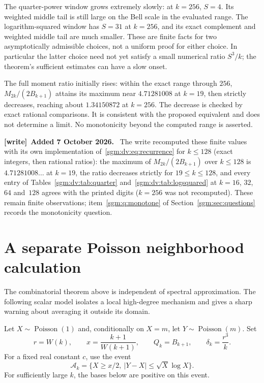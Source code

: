 \documentclass[11pt,letterpaper]{article}
\theoremstyle{remark}\newtheorem{remark}[theorem]{Remark}
\newcommand{\Poi}{\operatorname{Poisson}}\newcommand{\Bin}{\operatorname{Bin}}
\newenvironment{writenote}[1][]{\par\smallskip\begingroup\small
 \noindent\textbf{[write]}\if\relax\detokenize{#1}\relax\else~\textbf{#1.}\fi\ }%
 {\par\endgroup\smallskip}
\theoremstyle{definition}\newtheorem{definition}[theorem]{Definition}
\begin{document}
The quarter-power window grows extremely slowly: at $k=256$, $S=4$. Its weighted middle tail is still large on the Bell scale in the evaluated range. The logarithm-squared window has $S=31$ at $k=256$, and its exact complement and weighted middle tail are much smaller. These are finite facts for two asymptotically admissible choices, not a uniform proof for either choice. In particular the latter choice need not yet satisfy a small numerical ratio $S^3/k$; the theorem's sufficient estimates can have a slow onset.

The full moment ratio initially rises: within the exact range through $256$, $M_{2k}/(2B_{k+1})$ attains its maximum near $4.71281008$ at $k=19$, then strictly decreases, reaching about $1.34150872$ at $k=256$. The decrease is checked by exact rational comparisons. It is consistent with the proposed equivalent and does not determine a limit. No monotonicity beyond the computed range is asserted.

\begin{writenote}[Added 7 October 2026]
The write recomputed these finite values with its own implementation of~\eqref{sgm:dv:eq:recurrence} for $k\le128$ (exact integers, then rational ratios): the maximum of $M_{2k}/(2B_{k+1})$ over $k\le128$ is $4.71281008\ldots$ at $k=19$, the ratio decreases strictly for $19\le k\le128$, and every entry of Tables~\ref{sgm:dv:tab:quarter} and~\ref{sgm:dv:tab:logsquared} at $k=16$, $32$, $64$ and~$128$ agrees with the printed digits ($k=256$ was not recomputed). These remain finite observations; item~\ref{sgm:q:monotone} of Section~\ref{sgm:sec:questions} records the monotonicity question.
\end{writenote}

\section{A separate Poisson neighborhood calculation}\label{sgm:dv:sec:proxy}
The combinatorial theorem above is independent of spectral approximation. The following scalar model isolates a local high-degree mechanism and gives a sharp warning about averaging it outside its domain.

Let $X\sim\Poi(1)$ and, conditionally on $X=m$, let $Y\sim\Poi(m)$. Set
\[
 r=W(k),\qquad x=\frac{k+1}{W(k+1)},\qquad Q_k=B_{k+1},
 \qquad \delta_k=\frac{r^3}{k}.
\]
For a fixed real constant $c$, use the event
\begin{equation}\label{sgm:dv:eq:good}
 \mathcal A_k=\{X\ge x/2,\ |Y-X|\le\sqrt X\log X\}.
\end{equation}
For sufficiently large $k$, the bases below are positive on this event.
\end{document}
